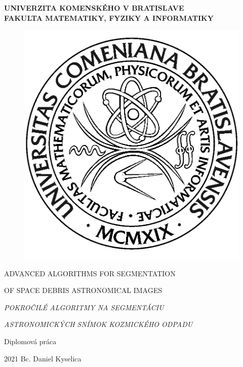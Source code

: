 \thispagestyle{empty}

\noindent
\begin{minipage}{\textwidth}
\begin{center}
\textbf{UNIVERZITA KOMENSKÉHO V BRATISLAVE \\ FAKULTA MATEMATIKY, FYZIKY A INFORMATIKY}
\end{center}
\end{minipage}

\vfill
\begin{figure}[!hbt]
	\begin{center}
		\includegraphics{front_pages/images/logo_fmph}
		\label{img:logo}
	\end{center}
\end{figure}
\begin{center}
	\begin{minipage}{0.8\textwidth}
		\centerline{\Large\MakeUppercase{Advanced algorithms for segmentation}}
		\centerline{\Large\MakeUppercase{of space debris astronomical images}}
		\centerline{\Large\MakeUppercase{}}
		\centerline{\Large\MakeUppercase{\textit{Pokročilé algoritmy na segmentáciu}}} \centerline{\Large\MakeUppercase{\textit{astronomických snímok kozmického odpadu}}}

		\smallskip
		\centerline{Diplomová práca}
	\end{minipage}
\end{center}
\vfill
2021 \hfill
Bc. Daniel Kyselica
\eject 